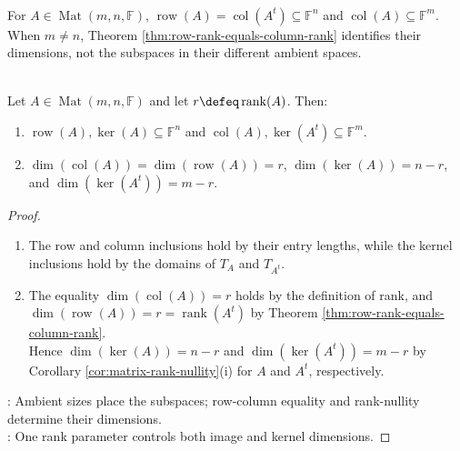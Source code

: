 \begin{perspective} \label{per:row-column-rank-different-hosts} \\
For $A\in\operatorname{Mat}(m,n,\mathbb{F})$, $\operatorname{row}(A)=\operatorname{col}(A^t)\subseteq\mathbb{F}^n$ and $\operatorname{col}(A)\subseteq\mathbb{F}^m$.\\
When $m\neq n$, Theorem \ref{thm:row-rank-equals-column-rank} identifies their dimensions, not the subspaces in their different ambient spaces.
\end{perspective}

\begin{theorem} \label{thm:matrix-four-fundamental-subspaces-dimensions} \\
Let $A\in\operatorname{Mat}(m,n,\mathbb{F})$ and let $r\defeq\operatorname{rank}(A)$. Then:
\begin{enumerate}[label=(\roman*)]
\setlength{\itemsep}{0pt}
\item $\operatorname{row}(A),\ker(A)\subseteq\mathbb{F}^n$ and $\operatorname{col}(A),\ker(A^t)\subseteq\mathbb{F}^m$.
\item $\dim(\operatorname{col}(A))=\dim(\operatorname{row}(A))=r$, $\dim(\ker(A))=n-r$, and $\dim(\ker(A^t))=m-r$.
\end{enumerate}
\begin{proof}
\begin{enumerate}[label=(\roman*)]
\setlength{\itemsep}{0pt}
\item The row and column inclusions hold by their entry lengths, while the kernel inclusions hold by the domains of $T_A$ and $T_{A^t}$.
\item The equality $\dim(\operatorname{col}(A))=r$ holds by the definition of rank, and $\dim(\operatorname{row}(A))=r=\operatorname{rank}(A^t)$ by Theorem \ref{thm:row-rank-equals-column-rank}.\\
Hence $\dim(\ker(A))=n-r$ and $\dim(\ker(A^t))=m-r$ by Corollary \ref{cor:matrix-rank-nullity}(i) for $A$ and $A^t$, respectively.
\end{enumerate}
: Ambient sizes place the subspaces; row-column equality and rank-nullity determine their dimensions.\\
: One rank parameter controls both image and kernel dimensions.
\end{proof}
\end{theorem}

\begin{illustrationfigure}[H]
  \scalebox{0.9}{}
  \caption{Hosts and dimensions of the four fundamental subspaces, with arrows for $A:\mathbb{F}^n\to\mathbb{F}^m$ and $A^t:\mathbb{F}^m\to\mathbb{F}^n$.}
  \label{fig:four-fundamental-subspaces-hosts}
\end{illustrationfigure}

